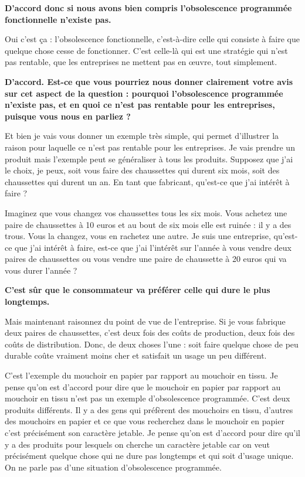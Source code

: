\begin{small}
\textbf{D'accord donc si nous avons bien compris l'obsolescence programmée fonctionnelle n'existe pas.}\smallbreak

Oui c'est ça : l'obsolescence  fonctionnelle, c'est-à-dire celle qui consiste à faire que quelque chose cesse de fonctionner. C'est celle-là qui est une stratégie qui n'est pas rentable, que les entreprises ne mettent pas en œuvre, tout simplement.

\smallbreak\textbf{D'accord. Est-ce que vous pourriez nous donner clairement votre avis sur cet aspect de la question : pourquoi l'obsolescence programmée  n'existe pas, et en quoi ce n'est pas rentable pour les entreprises, puisque vous nous en parliez ?
}\smallbreak

Et bien je vais vous donner un exemple très simple, qui permet d'illustrer la raison pour laquelle ce n'est pas rentable pour les entreprises. Je vais prendre un produit mais l'exemple peut se généraliser à tous les produits. Supposez que j'ai le choix, je peux, soit vous faire des chaussettes qui durent six mois, soit des chaussettes qui durent un an. En tant que fabricant, qu'est-ce que j'ai intérêt à faire ?  

Imaginez que vous changez vos chaussettes tous les six mois. Vous achetez une paire de chaussettes à 10 euros et au bout de six mois elle est ruinée : il y a des trous. Vous la changez, vous en rachetez une autre. Je suis une entreprise, qu'est-ce que j'ai intérêt à faire, est-ce que j'ai l'intérêt sur l'année à vous vendre deux paires de chaussettes ou vous vendre une paire de chaussette à 20 euros qui va vous durer l'année ?

\smallbreak\textbf{C'est sûr que le consommateur va préférer celle qui dure le plus longtemps.}\smallbreak

Mais maintenant raisonnez du point de vue de l'entreprise. Si je vous fabrique deux paires de chaussettes, c'est deux fois des coûts de production, deux fois des coûts de distribution. Donc, de deux choses l'une : soit faire quelque chose de peu durable coûte vraiment moins cher et satisfait un usage un peu différent. 

C'est l'exemple du mouchoir en papier par rapport au mouchoir en tissu. Je pense qu'on est d'accord pour dire que le mouchoir en papier par rapport au mouchoir en tissu n'est pas un exemple d'obsolescence programmée. C'est deux produits différents. Il y a des gens qui préfèrent des mouchoirs en tissu, d'autres des mouchoirs en papier et ce que vous recherchez dans le mouchoir en papier c'est précisément son caractère jetable. Je pense qu'on est d'accord pour dire qu'il y a des produits pour lesquels on cherche un caractère jetable car on veut précisément quelque chose qui ne dure pas longtemps et qui soit d'usage unique. On ne parle pas d'une situation d'obsolescence programmée. 


\end{small}

